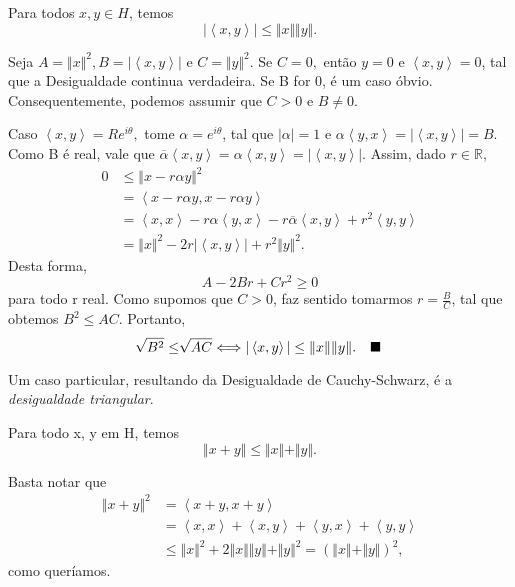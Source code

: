 \documentclass[measure_theory.tex]{subfiles}
\begin{document}
\hypertarget{cauchy_schwarz}{
	\begin{theorem*}
		Para todos \(x, y\in H\), temos
		\[
			|\left< x, y \right>|\leq \Vert x \Vert \Vert y \Vert.
		\]
	\end{theorem*}}
\begin{proof*}
	Seja \(A = \Vert x \Vert^{2}, B = |\left< x, y \right>|\) e \(C = \Vert y \Vert^{2}\). Se \(C = 0,\) então \(y=0\) e \(\left< x, y \right> = 0\), tal que a Desigualdade continua verdadeira. Se B for 0,
	é um caso óbvio. Consequentemente, podemos assumir que \(C > 0\) e \(B\neq 0\).

	Caso \(\left< x, y \right> = R e^{i\theta },\) tome \(\alpha  = e^{i\theta }\), tal que \(|\alpha| = 1\) e \(\alpha \left< y, x \right> = |\left< x, y \right>| = B.\) Como B é real, vale que \(\overline{\alpha }\left< x, y \right> = \alpha \left< x, y \right> = |\left< x, y \right>|\). Assim,
	dado \(r\in \mathbb{R},\)
	\begin{align*}
		0 & \leq \Vert x-r\alpha y \Vert^{2}                                                                                        \\
		  & =\left< x-r\alpha y, x-r\alpha y \right>                                                                                \\
		  & = \left< x, x \right> - r\alpha \left< y, x \right> - r\overline{\alpha }\left< x, y \right> + r^{2}\left< y, y \right> \\
		  & = \Vert x \Vert^{2} - 2r|\left< x, y \right>| + r^{2}\Vert y \Vert^{2}.
	\end{align*}
	Desta forma,
	\[
		A - 2Br + Cr^{2} \geq 0
	\]
	para todo r real. Como supomos que \(C > 0\), faz sentido tomarmos \(r = \frac{B}{C}\), tal que obtemos \(B^{2} \leq AC.\) Portanto,
	\[
		\sqrt[]{B^{2}}\leq \sqrt[]{AC} \Longleftrightarrow |\left< x, y \right>|\leq \Vert x \Vert\Vert y \Vert.\quad \text{$\blacksquare$}
	\]
\end{proof*}
Um caso particular, resultando da Desigualdade de Cauchy-Schwarz, é a \textit{desigualdade triangular}.
\begin{prop*}
	Para todo x, y em H, temos
	\[
		\Vert x + y \Vert \leq \Vert x \Vert + \Vert y \Vert.
	\]
\end{prop*}
\begin{proof*}
	Basta notar que
	\begin{align*}
		\Vert x + y \Vert^{2} & = \left< x + y, x + y \right>                                                                                   \\
		                      & = \left< x, x \right> + \left< x, y \right> + \left< y, x \right> + \left< y, y \right>                         \\
		                      & \leq \Vert x \Vert^{2} + 2\Vert x \Vert\Vert y \Vert + \Vert y \Vert^{2} = (\Vert x \Vert + \Vert y \Vert)^{2},
	\end{align*}
	como queríamos. \qedsymbol
\end{proof*}
\end{document}
